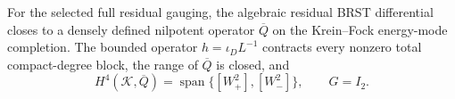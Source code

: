 \begin{theorem}
For the selected full residual gauging, the algebraic residual
BRST differential closes to a densely defined nilpotent operator
$\overline Q$ on the Krein--Fock energy-mode completion.
The bounded operator $h=\iota_D L^{-1}$ contracts every nonzero
total compact-degree block, the range of $\overline Q$ is closed, and
\[H^4(\mathscr K,\overline Q)=
\operatorname{span}\{[W_+^2],[W_-^2]\},\qquad G=I_2.\]
\end{theorem}
